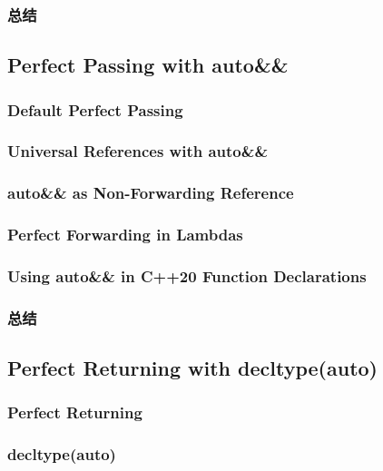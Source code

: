 \documentclass[11pt,a4paper,UTF8]{ctexart}
\begin{document}
		\subsubsection{总结}
	\subsection{Perfect Passing with auto\&\&}
		\subsubsection{Default Perfect Passing}
		\subsubsection{Universal References with auto\&\&}
		\subsubsection{auto\&\& as Non-Forwarding Reference}
		\subsubsection{Perfect Forwarding in Lambdas}
		\subsubsection{Using auto\&\& in C++20 Function Declarations}
		\subsubsection{总结}
	\subsection{Perfect Returning with decltype(auto)}
		\subsubsection{Perfect Returning}
		\subsubsection{decltype(auto)}
\end{document}
